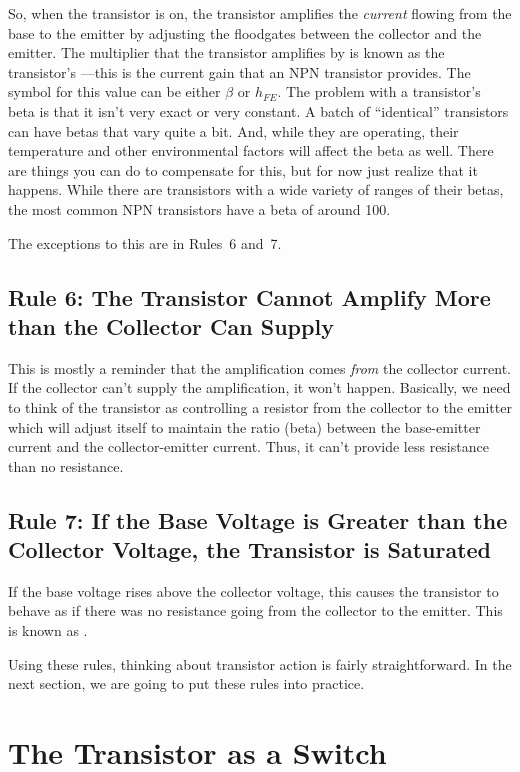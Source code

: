 So, when the transistor is on, the transistor amplifies the \emph{current} flowing from the base to the emitter by adjusting the floodgates between the collector and the emitter.
The multiplier that the transistor amplifies by is known as the transistor's ---this is the current gain that an NPN transistor provides.  
The symbol for this value can be either $\beta$ or $h_{FE}$.
The problem with a transistor's beta is that it isn't very exact or very constant.
A batch of ``identical'' transistors can have betas that vary quite a bit.
And, while they are operating, their temperature and other environmental factors will affect the beta as well.
There are things you can do to compensate for this, but for now just realize that it happens.
While there are transistors with a wide variety of ranges of their betas, the most common NPN transistors have a beta of around 100.

The exceptions to this are in Rules~6 and~7.

\subsection*{Rule 6: The Transistor Cannot Amplify More than the Collector Can Supply}

This is mostly a reminder that the amplification comes \emph{from} the collector current.
If the collector can't supply the amplification, it won't happen.
Basically, we need to think of the transistor as controlling a resistor from the collector to the emitter which will adjust itself to maintain the ratio (beta) between the base-emitter current and the collector-emitter current.
Thus, it can't provide less resistance than no resistance.

\subsection*{Rule 7: If the Base Voltage is Greater than the Collector Voltage, the Transistor is Saturated}

If the base voltage rises above the collector voltage, this causes the transistor to behave as if there was no resistance going from the collector to the emitter.
This is known as .

Using these rules, thinking about transistor action is fairly straightforward.
In the next section, we are going to put these rules into practice.

\section{The Transistor as a Switch}

